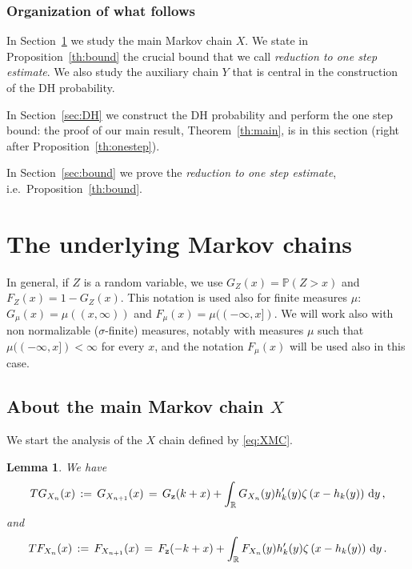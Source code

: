 \documentclass[reqno,11pt]{amsart}
\numberwithin{equation}{section}
\newtheorem{lemma}[theorem]{Lemma}
\newcommand{\dd}{\,\text{\rm d}}             %
\newcommand{\bbP}{{\ensuremath{\mathbb P}} }
\newcommand{\bbR}{{\ensuremath{\mathbb R}} }
\newcommand{\gz}{\zeta}
\newcommand{\gs}{\sigma}
\newcommand{\logZ}{\mathtt{z}}
\begin{document}
\subsubsection{Organization of what follows}
In Section~\ref{sec:XY} we study the main Markov chain $X$. We state   in Proposition~\ref{th:bound} the crucial bound that we call \emph{reduction to one step estimate}. We also study the auxiliary chain $Y$ that is central in the construction of the DH probability. 

In Section~\ref{sec:DH} we construct the DH probability and perform the one step bound: 
the proof of our main result, Theorem~\ref{th:main}, is in this section (right after Proposition~\ref{th:onestep}). 

In Section~\ref{sec:bound} we prove the \emph{reduction to one step estimate}, i.e.\ Proposition~\ref{th:bound}. 




\section{The underlying Markov chains}
\label{sec:XY}



In general, if $Z$ is a random variable, we use $G_Z(x)=\bbP(Z>x)$ and $F_Z(x)=1-G_Z(x)$. This notation is used also for finite  measures $\mu$: 
$G_\mu(x)= \mu((x, \infty))$ and 
$F_\mu(x)= \mu((-\infty, x])$. We will work also with non normalizable ($\gs$-finite) measures, notably with measures $\mu$ such that $\mu((-\infty, x])< \infty$ for every $x$, and the notation $F_\mu(x)$ will be used also in this case.

\subsection{About the main Markov chain $X$}
We start the analysis of the $X$ chain defined by \eqref{eq:XMC}.
\medskip

\begin{lemma}
We have 
\begin{equation}
\label{eq:GXTn}
T G_{X_n}(x)\, :=\,G_{X_{n+1}}(x)\, =\,  G_{\logZ}(k+x) +\int_\bbR G_{X_n}(y)h_k'(y) \gz\left( x-h_k(y)\right) \dd y
\,  ,
\end{equation}
and
\begin{equation}
\label{eq:FXTn}
T F_{X_n}(x)\, :=\,F_{X_{n+1}}(x)\, =\,  F_{\logZ}(-k+x) +\int_\bbR F_{X_n}(y)h_k'(y) \gz\left( x-h_k(y)\right) \dd y
\,  .
\end{equation}
\end{lemma}
\end{document}
